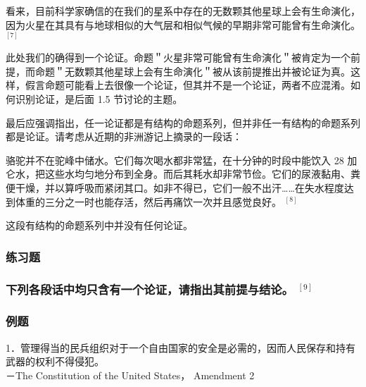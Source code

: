 看来，目前科学家确信的在我们的星系中存在的无数颗其他星球上会有生命演化，因为火星在其具有与地球相似的大气层和相似气候的早期非常可能曾有生命演化。 ${ }^{[7]}$

此处我们的确得到一个论证。命题＂火星非常可能曾有生命演化＂被肯定为一个前提，而命题＂无数颗其他星球上会有生命演化＂被从该前提推出并被论证为真。这样，假言命题可能看上去很像一个论证，但其并不是一个论证，两者不应混淆。如何识别论证，是后面 1.5 节讨论的主题。

最后应强调指出，任一论证都是有结构的命题系列，但并非任一有结构的命题系列都是论证。请考虑从近期的非洲游记上摘录的一段话：

\begin{displayquote}
骆驼并不在驼峰中储水。它们每次喝水都非常猛，在十分钟的时段中能饮入 28 加仑水，把这些水均匀地分布到全身。而后其耗水却非常节俭。它们的尿液黏甪、粪便干燥，并以算呼吸而紧闭其口。如非不得已，它们一般不出汗……在失水程度达到体重的三分之一时也能存活，然后再痛饮一次并且感觉良好。 ${ }^{[8]}$
\end{displayquote}

这段有结构的命题系列中并没有任何论证。

\subsubsection{练习题}
\subsubsection*{下列各段话中均只含有一个论证，请指出其前提与结论。 ${ }^{[9]}$}
\subsubsection*{例题}
1．管理得当的民兵组织对于一个自由国家的安全是必需的，因而人民保存和持有武器的权利不得侵犯。\\
－The Constitution of the United States， Amendment 2

